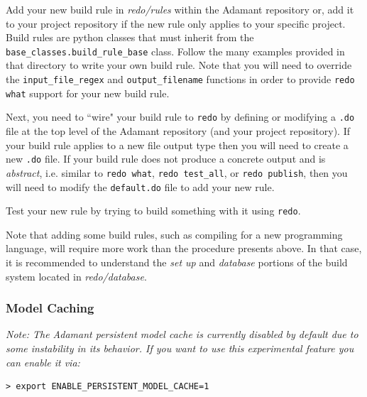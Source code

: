 \vspace{5mm} %
\begin{spacedenumerate}
  \item Add your new build rule in \textit{redo/rules} within the Adamant repository or, add it to your project repository if the new rule only applies to your specific project. Build rules are python classes that must inherit from the \texttt{base\_classes.build\_rule\_base} class. Follow the many examples provided in that directory to write your own build rule. Note that you will need to override the \texttt{input\_file\_regex} and \texttt{output\_filename} functions in order to provide \texttt{redo what} support for your new build rule.
  \item Next, you need to ``wire" your build rule to \texttt{redo} by defining or modifying a \texttt{.do} file at the top level of the Adamant repository (and your project repository). If your build rule applies to a new file output type then you will need to create a new \texttt{.do} file. If your build rule does not produce a concrete output and is \textit{abstract}, i.e. similar to \texttt{redo what}, \texttt{redo test\_all}, or \texttt{redo publish}, then you will need to modify the \texttt{default.do} file to add your new rule. 
  \item Test your new rule by trying to build something with it using \texttt{redo}.
\end{spacedenumerate}
\vspace{5mm} %

Note that adding some build rules, such as compiling for a new programming language, will require more work than the procedure presents above. In that case, it is recommended to understand the \textit{set up} and \textit{database} portions of the build system located in \textit{redo/database}.

\subsubsection{Model Caching} \label{The Model Cache}

\textit{Note: The Adamant persistent model cache is currently disabled by default due to some instability in its behavior. If you want to use this experimental feature you can enable it via:}

\vspace{5mm} %
\begin{verbatim}
> export ENABLE_PERSISTENT_MODEL_CACHE=1
\end{verbatim}
\vspace{5mm} %

